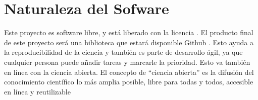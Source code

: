 \section{Naturaleza del Sofware}

Este proyecto es software libre, y está liberado con la licencia \cite{gplv3}. El producto final de este proyecto será una
biblioteca que estará disponible Github \cite{project_repository}. Esto ayuda a la reproducibilidad de la ciencia y 
también es parte de desarrollo ágil, ya que cualquier persona puede añadir tareas y marcarle la prioridad. Esto va 
también en línea con la ciencia abierta. El concepto de “ciencia abierta” es la difusión del conocimiento científico 
lo más amplia posible, libre para todas y todos, accesible en línea y reutilizable